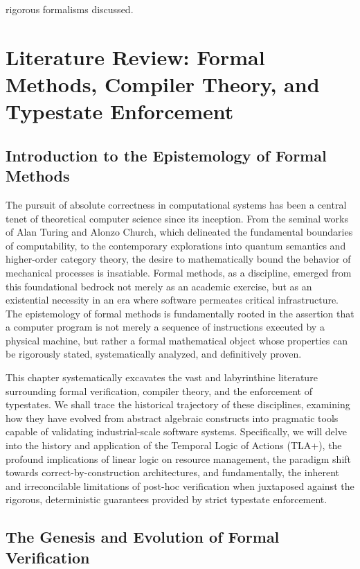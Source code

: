 rigorous formalisms discussed. \n\chapter{Literature Review: Formal Methods, Compiler Theory, and Typestate Enforcement}
\label{ch:lit_review_formal}

\section{Introduction to the Epistemology of Formal Methods}

The pursuit of absolute correctness in computational systems has been a central tenet of theoretical computer science since its inception. From the seminal works of Alan Turing and Alonzo Church, which delineated the fundamental boundaries of computability, to the contemporary explorations into quantum semantics and higher-order category theory, the desire to mathematically bound the behavior of mechanical processes is insatiable. Formal methods, as a discipline, emerged from this foundational bedrock not merely as an academic exercise, but as an existential necessity in an era where software permeates critical infrastructure. The epistemology of formal methods is fundamentally rooted in the assertion that a computer program is not merely a sequence of instructions executed by a physical machine, but rather a formal mathematical object whose properties can be rigorously stated, systematically analyzed, and definitively proven.

This chapter systematically excavates the vast and labyrinthine literature surrounding formal verification, compiler theory, and the enforcement of typestates. We shall trace the historical trajectory of these disciplines, examining how they have evolved from abstract algebraic constructs into pragmatic tools capable of validating industrial-scale software systems. Specifically, we will delve into the history and application of the Temporal Logic of Actions (TLA+), the profound implications of linear logic on resource management, the paradigm shift towards correct-by-construction architectures, and fundamentally, the inherent and irreconcilable limitations of post-hoc verification when juxtaposed against the rigorous, deterministic guarantees provided by strict typestate enforcement.

\section{The Genesis and Evolution of Formal Verification}

